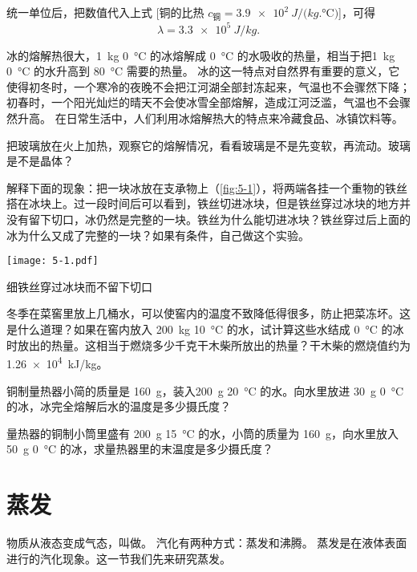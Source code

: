 统一单位后，把数值代入上式 [铜的比热 $c_{\text{铜}}=\qty{3.9e2}{J/(kg.\celsius)}$]，可得
\[\lambda=\qty{3.3e5}{J/kg}.\]

冰的熔解热很大，\qty{1}{kg} \qty{0}{\celsius} 的冰熔解成 \qty{0}{\celsius} 的水吸收的热量，相当于把\qty{1}{kg} \qty{0}{\celsius} 的水升高到 \qty{80}{\celsius} 需要的热量。
冰的这一特点对自然界有重要的意义，它使得初冬时，一个寒冷的夜晚不会把江河湖全部封冻起来，气温也不会骤然下降；初春时，一个阳光灿烂的晴天不会使冰雪全部熔解，造成江河泛滥，气温也不会骤然升高。
在日常生活中，人们利用冰熔解热大的特点来冷藏食品、冰镇饮料等。

\begin{Practice}
\begin{question}
  \item 把玻璃放在火上加热，观察它的熔解情况，看看玻璃是不是先变软，再流动。玻璃是不是晶体？
  \item 解释下面的现象：把一块冰放在支承物上（\cref{fig:5-1}），将两端各挂一个重物的铁丝搭在冰块上。过一段时间后可以看到，铁丝切进冰块，但是铁丝穿过冰块的地方并没有留下切口，冰仍然是完整的一块。铁丝为什么能切进冰块？铁丝穿过后上面的冰为什么又成了完整的一块？如果有条件，自己做这个实验。
  \begin{figurehere}
    \begin{minipage}{\linewidth}\centering
      \texttt{[image: 5-1.pdf]}
      \caption{细铁丝穿过冰块而不留下切口}\label{fig:5-1}
    \end{minipage}
  \end{figurehere}
  \item 冬季在菜窖里放上几桶水，可以使窖内的温度不致降低得很多，防止把菜冻坏。这是什么道理？如果在窖内放入 \qty{200}{kg} \qty{10}{\celsius} 的水，试计算这些水结成 \qty{0}{\celsius} 的冰时放出的热量。这相当于燃烧多少千克干木柴所放出的热量？干木柴的燃烧值约为 \qty{1.26e4}{kJ/kg}。
  \item 铜制量热器小简的质量是 \qty{160}{g}，装入\qty{200}{g} \qty{20}{\celsius} 的水。向水里放进 \qty{30}{g} \qty{0}{\celsius} 的冰，冰完全熔解后水的温度是多少摄氏度？
  \item 量热器的铜制小筒里盛有 \qty{200}{g} \qty{15}{\celsius} 的水，小筒的质量为 \qty{160}{g}，向水里放入 \qty{50}{g} \qty{0}{\celsius} 的冰，求量热器里的末温度是多少摄氏度？
\end{question}
\end{Practice}

\section{蒸发}
物质从液态变成气态，叫做。
汽化有两种方式：蒸发和沸腾。
蒸发是在液体表面进行的汽化现象。这一节我们先来研究蒸发。

